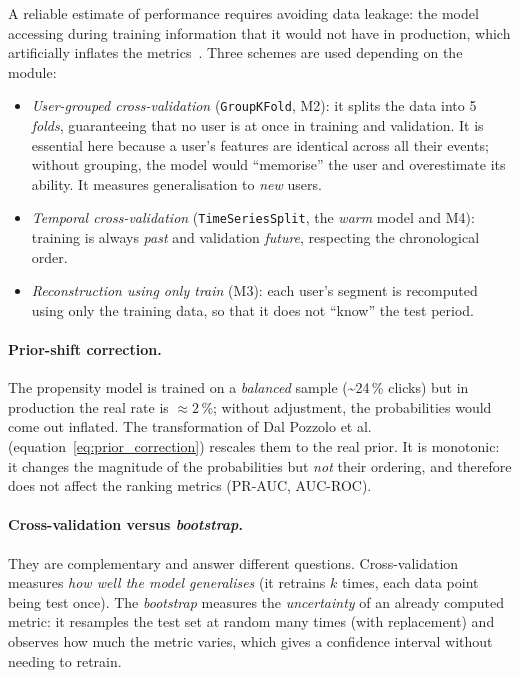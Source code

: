 A reliable estimate of performance requires avoiding data leakage: the model accessing during training information that it would not have in production, which artificially inflates the metrics~\cite{kaufman2012leakage}. Three schemes are used depending on the module:
\begin{itemize}
    \item \emph{User-grouped cross-validation} (\texttt{GroupKFold}, M2): it splits the data into 5 \emph{folds}, guaranteeing that no user is at once in training and validation. It is essential here because a user's features are identical across all their events; without grouping, the model would ``memorise'' the user and overestimate its ability. It measures generalisation to \emph{new} users.
    \item \emph{Temporal cross-validation} (\texttt{TimeSeriesSplit}, the \textit{warm} model and M4): training is always \emph{past} and validation \emph{future}, respecting the chronological order.
    \item \emph{Reconstruction using only \textit{train}} (M3): each user's segment is recomputed using only the training data, so that it does not ``know'' the test period.
\end{itemize}

\paragraph{Prior-shift correction.} The propensity model is trained on a \emph{balanced} sample (\textasciitilde24\,\% clicks) but in production the real rate is $\approx 2$\,\%; without adjustment, the probabilities would come out inflated. The transformation of Dal Pozzolo et al.~\cite{dalpozzolo2015} (equation~\ref{eq:prior_correction}) rescales them to the real prior. It is monotonic: it changes the magnitude of the probabilities but \emph{not} their ordering, and therefore does not affect the ranking metrics (PR-AUC, AUC-ROC).

\paragraph{Cross-validation versus \textit{bootstrap}.} They are complementary and answer different questions. Cross-validation measures \emph{how well the model generalises} (it retrains $k$ times, each data point being test once). The \textit{bootstrap} measures the \emph{uncertainty} of an already computed metric: it resamples the test set at random many times (with replacement) and observes how much the metric varies, which gives a confidence interval without needing to retrain.

